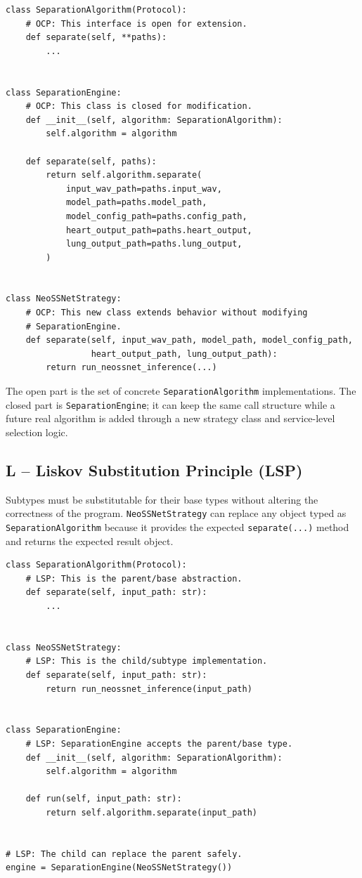 \begin{lstlisting}[caption={OCP Example: Extend with a New Algorithm}]
class SeparationAlgorithm(Protocol):
    # OCP: This interface is open for extension.
    def separate(self, **paths):
        ...


class SeparationEngine:
    # OCP: This class is closed for modification.
    def __init__(self, algorithm: SeparationAlgorithm):
        self.algorithm = algorithm

    def separate(self, paths):
        return self.algorithm.separate(
            input_wav_path=paths.input_wav,
            model_path=paths.model_path,
            model_config_path=paths.config_path,
            heart_output_path=paths.heart_output,
            lung_output_path=paths.lung_output,
        )


class NeoSSNetStrategy:
    # OCP: This new class extends behavior without modifying
    # SeparationEngine.
    def separate(self, input_wav_path, model_path, model_config_path,
                 heart_output_path, lung_output_path):
        return run_neossnet_inference(...)
\end{lstlisting}

The open part is the set of concrete \texttt{SeparationAlgorithm} implementations. The closed part is \texttt{SeparationEngine}; it can keep the same call structure while a future real algorithm is added through a new strategy class and service-level selection logic.

\subsection{L -- Liskov Substitution Principle (LSP)}

Subtypes must be substitutable for their base types without altering the correctness of the program. \texttt{NeoSSNetStrategy} can replace any object typed as \texttt{SeparationAlgorithm} because it provides the expected \texttt{separate(...)} method and returns the expected result object.

\begin{lstlisting}[caption={LSP Example: NeoSSNet Substitutes the Strategy Interface}]
class SeparationAlgorithm(Protocol):
    # LSP: This is the parent/base abstraction.
    def separate(self, input_path: str):
        ...


class NeoSSNetStrategy:
    # LSP: This is the child/subtype implementation.
    def separate(self, input_path: str):
        return run_neossnet_inference(input_path)


class SeparationEngine:
    # LSP: SeparationEngine accepts the parent/base type.
    def __init__(self, algorithm: SeparationAlgorithm):
        self.algorithm = algorithm

    def run(self, input_path: str):
        return self.algorithm.separate(input_path)


# LSP: The child can replace the parent safely.
engine = SeparationEngine(NeoSSNetStrategy())
\end{lstlisting}

